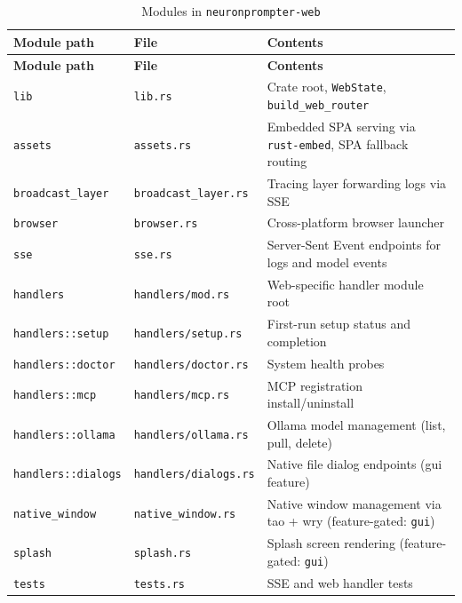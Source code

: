 \documentclass[a4paper, 11pt, oneside]{report}
\begin{document}
{\footnotesize
\begin{longtable}{L{4cm} L{4.8cm} L{5.8cm}}
  \caption{Modules in \texttt{neuronprompter-web}}
  \label{tab:mod-web} \\
  \toprule
  \textbf{Module path} & \textbf{File} & \textbf{Contents} \\
  \midrule
  \endfirsthead
  \toprule
  \textbf{Module path} & \textbf{File} & \textbf{Contents} \\
  \midrule
  \endhead
  \texttt{lib}                    & \texttt{lib.rs}              & Crate root, \texttt{WebState}, \texttt{build\_web\_router} \\
  \texttt{assets}                 & \texttt{assets.rs}           & Embedded SPA serving via \texttt{rust-embed},
                                                                    SPA fallback routing \\
  \texttt{broadcast\_layer}       & \texttt{broadcast\_layer.rs} & Tracing layer forwarding logs via SSE \\
  \texttt{browser}                & \texttt{browser.rs}          & Cross-platform browser launcher \\
  \texttt{sse}                    & \texttt{sse.rs}              & Server-Sent Event endpoints for logs
                                                                    and model events \\
  \texttt{handlers}               & \texttt{handlers/mod.rs}     & Web-specific handler module root \\
  \texttt{handlers::setup}        & \texttt{handlers/setup.rs}   & First-run setup status and completion \\
  \texttt{handlers::doctor}       & \texttt{handlers/doctor.rs}  & System health probes \\
  \texttt{handlers::mcp}          & \texttt{handlers/mcp.rs}     & MCP registration install/uninstall \\
  \texttt{handlers::ollama}       & \texttt{handlers/ollama.rs}  & Ollama model management (list, pull, delete) \\
  \texttt{handlers::dialogs}      & \texttt{handlers/dialogs.rs} & Native file dialog endpoints (gui feature) \\
  \texttt{native\_window}         & \texttt{native\_window.rs}   & Native window management via tao + wry
                                                                    (feature-gated: \texttt{gui}) \\
  \texttt{splash}                 & \texttt{splash.rs}           & Splash screen rendering
                                                                    (feature-gated: \texttt{gui}) \\
  \texttt{tests}                  & \texttt{tests.rs}            & SSE and web handler tests \\
  \bottomrule
\end{longtable}
}
\end{document}
